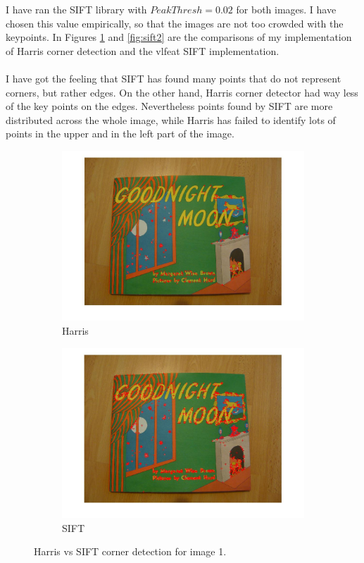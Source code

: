 \documentclass[paper=a4, fontsize=11pt]{scrartcl} %
\numberwithin{equation}{section} %
\numberwithin{figure}{section} %
\numberwithin{table}{section} %
\begin{document}
I have ran the SIFT library with $PeakThresh = 0.02$ for both images. I have chosen this value empirically, so that the images are not too crowded with the keypoints. In Figures \ref{fig:sift1} and \ref{fig:sift2} are the comparisons of my implementation of Harris corner detection and the vlfeat SIFT implementation. \\
\\
I have got the feeling that SIFT has found many points that do not represent corners, but rather edges. On the other hand, Harris corner detector had way less of the key points on the edges. Nevertheless points found by SIFT are more distributed across the whole image, while Harris has failed to identify lots of points in the upper and in the left part of the image. 

\begin{figure}
\centering
\begin{subfigure}{.5\textwidth}
  \centering
  \includegraphics[width=1\linewidth]{im1_harris_corners.jpg}
  \caption{Harris}
\end{subfigure}%
\begin{subfigure}{.5\textwidth}
  \centering
  \includegraphics[width=1\linewidth]{img1_sift_corners.jpg}
  \caption{SIFT}
\end{subfigure}
\caption{Harris vs SIFT corner detection for image 1.}
\label{fig:sift1}
\end{figure}
\end{document}
